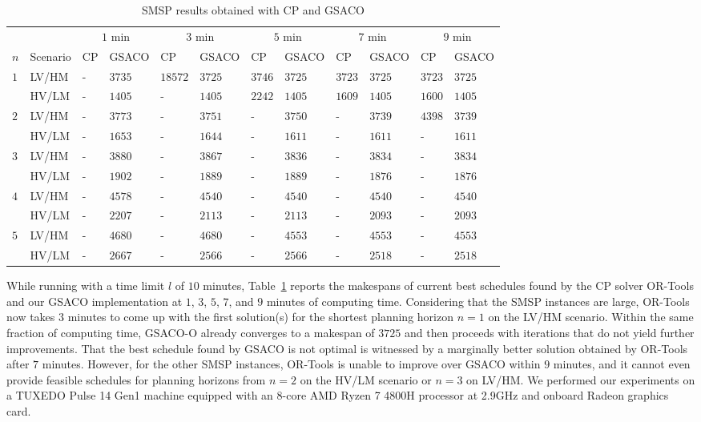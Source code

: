 \begin{table}[t]
	\caption{SMSP results obtained with CP and GSACO \cite{Ali2024}}\label{tab:results} \centering
	\begin{tabular}{|l|l|l|l|l|l|l|l|l|l|l|l|}
		\hline
		&
		&
		\multicolumn{2}{c|}{$1$ min} &
		\multicolumn{2}{c|}{$3$ min} &
		\multicolumn{2}{c|}{$5$ min} &
		\multicolumn{2}{c|}{$7$ min} &
		\multicolumn{2}{c|}{$9$ min} \\ \cline{3-12} 
		$n$ & Scenario & CP & GSACO & CP & GSACO & CP & GSACO & CP & GSACO & CP & GSACO \\ \hline
		\multirow{2}{*}{$1$} & LV/HM & - & $3735$ & $18572$ & $3725$ & $3746$ & $3725$ & $3723$ & $3725$ & $3723$ & $3725$  \\
		& HV/LM & - & $1405$ & - & $1405$ & $2242$ & $1405$ & $1609$ & $1405$ & $1600$ & $1405$ \\
		\multirow{2}{*}{$2$} & LV/HM & - & $3773$ & - & $3751$ & - & $3750$ & - & $3739$ & $4398$ & $3739$ \\
		& HV/LM & - & $1653$ & - & $1644$ & - & $1611$ & - & $1611$ & - & $1611$   \\
		\multirow{2}{*}{$3$} & LV/HM & - & $3880$ & - & $3867$ & - & $3836$ & - & $3834$ & - & $3834$   \\
		& HV/LM & - & $1902$ & - & $1889$ & - & $1889$ & - & $1876$ & - & $1876$     \\
		\multirow{2}{*}{$4$} & LV/HM & - & $4578$ & - & $4540$ & - & $4540$ & - & $4540$ & - & $4540$     \\
		& HV/LM & - & $2207$ & - & $2113$ & - & $2113$ & - & $2093$ & - & $2093$  \\
		\multirow{2}{*}{$5$} & LV/HM & - & $4680$ & - & $4680$ & - & $4553$ & - & $4553$ & - & $4553$   \\	
		& HV/LM & - & $2667$ & - & $2566$ & - & $2566$ & - & $2518$ & - & $2518$ \\
		\hline  
	\end{tabular}
\end{table}

While running with a time limit $l$ of $10$ minutes,
Table~\ref{tab:results} reports the makespans of current best schedules
found by the CP solver OR-Tools and our GSACO implementation
at $1$, $3$, $5$, $7$, and $9$ minutes of computing time.
Considering that the SMSP instances are large,
OR-Tools now takes $3$ minutes to come up with the first solution(s)
for the shortest planning horizon $n=1$ on the LV/HM scenario.
Within the same fraction of computing time, GSACO-O already converges to a
makespan of $3725$ and then proceeds with iterations that do not
yield further improvements.
That the best schedule found by GSACO is not optimal is witnessed by a
marginally better solution obtained by OR-Tools after $7$ minutes.
However, for the other SMSP instances, OR-Tools is unable to improve over
GSACO within $9$ minutes, and it cannot even provide feasible schedules
for planning horizons from $n=2$ on the HV/LM scenario or $n=3$ 
on LV/HM.
We performed our experiments on a TUXEDO Pulse 14 Gen1 machine
equipped with an 8-core AMD Ryzen 7 4800H processor at 2.9GHz and onboard
Radeon graphics card.

